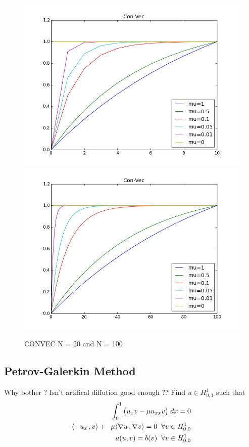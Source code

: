 \documentclass[a4paper,norsk]{article}
\begin{document}
\begin{figure}[h!]
	\centering
	\caption*{CONVEC N = 20 and N = 100}
	\includegraphics[scale=0.34]{convecart.png}
	\includegraphics[scale=0.34]{convecarthighn.png}
\end{figure}
\newpage

\subsection*{Petrov-Galerkin Method}
Why bother ? Isn't artifical diffution good enough ?? \newline
Find $u \in  H^1_{0,1}$ such that 
\begin{align*}
\int_0^1 \big( u_x v - \mu u_{xx} v \big) \hspace{1mm} dx = 0 \\
\inner[-u_x]{v} + \hspace{2mm} \mu \inner[\nabla u]{\nabla v} = 0 \hspace{2mm}  \forall v \in H^1_{0,0} \\
a(u, v)  = b(v)  \hspace{2mm}  \forall v \in H^1_{0,0} \\
\end{align*}
\end{document}
